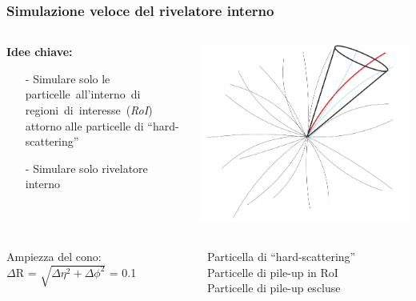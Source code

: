 \documentclass{beamer}
\begin{document}
\begin{frame}[t]
\frametitle{Simulazione veloce del rivelatore interno}

\begin{columns}
	\begin{column}{.45\textwidth}
	\begin{tcolorbox}{}
	\textbf{\color{dred} Idee chiave:}\\
	\begin{itemize}
	\item[\color{black}-]
	 \small Simulare solo le \\ 
	 \mbox{particelle all'interno di} \mbox{regioni di interesse (\textit{RoI})}
	 attorno alle particelle di ``hard-scattering''
	 \item[\color{black}-] Simulare solo rivelatore interno
	 \end{itemize}
	\end{tcolorbox}		
	
	\end{column}
	\begin{column}{.55\textwidth}
		\centering
		\includegraphics[width=.8\textwidth]{cone}
	\end{column}
\end{columns}

\begin{columns}
\begin{column}{.45\textwidth}
		\begin{block}{}
		Ampiezza del cono:\\
		$\Delta$R = $\sqrt{\Delta\eta^{2} + \Delta\phi^{2}}$ = 0.1
		\end{block}
\end{column}
\begin{column}{.55\textwidth}
		\begin{center}
		\small
		{\color{dred} Particella di ``hard-scattering''} \\
		\vskip0.2cm
		{\color{cyan} Particelle di pile-up in RoI} \\
		\vskip0.2cm
		{\color{gray} Particelle di pile-up escluse} \\
		\vskip0.2cm
		\end{center}
\end{column}
\end{columns}
	
\end{frame}
\end{document}
